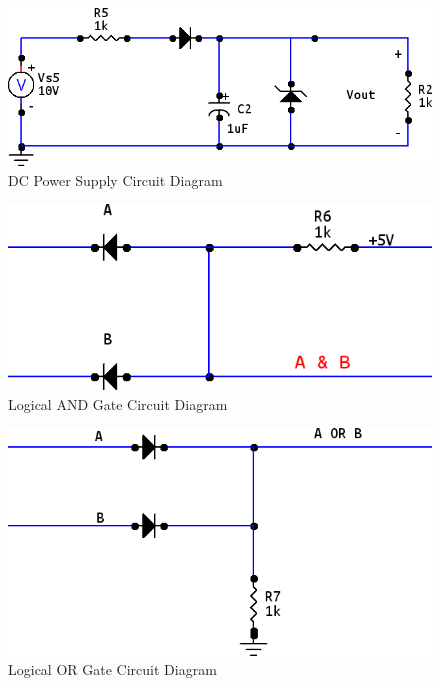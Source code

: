 \documentclass[twocolumn,english]{IEEEtran}
\begin{document}
  \begin{figure}[htpb]
  \begin{centering}
  \begin{center}
  \includegraphics[width=\linewidth]{./Images/acdc_circuit_diag.png}
  \caption{DC Power Supply Circuit Diagram}
  \label{fig:acdc_circuit_diag}
  \end{center}
  \par\end{centering}
  \end{figure}

  \begin{figure}[htpb]
  \begin{centering}
  \begin{center}
  \includegraphics[width=\linewidth]{./Images/and_gate.png}
  \caption{Logical AND Gate Circuit Diagram}
  \label{fig:and_gate_diagram}
  \end{center}
  \par\end{centering}
  \end{figure}

  \begin{figure}[htpb]
  \begin{centering}
  \begin{center}
  \includegraphics[width=\linewidth]{./Images/or_gate.png}
  \caption{Logical OR Gate Circuit Diagram}
  \label{fig:or_gate_diagram}
  \end{center}
  \par\end{centering}
  \end{figure}

%
%
\end{document}
